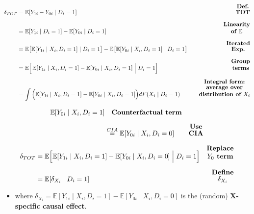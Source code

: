\documentclass[12pt]{article}
\begin{document}
\singlespacing
\begin{align}
\delta_{TOT} 
   &= \mathbb{E}[Y_{1i} - Y_{0i} \mid D_i = 1] 
   & \text{\textbf{\shortstack{Def. \\ TOT}}} \\[6pt]
&= \mathbb{E}[Y_{1i} \mid D_i=1] - \mathbb{E}[Y_{0i} \mid D_i=1] 
   & \text{\textbf{\shortstack{Linearity \\ of $\mathbb{E}$}}} \\[6pt]
&= \mathbb{E}\big[ \mathbb{E}[Y_{1i}\mid X_i, D_i=1] \mid D_i=1 \big] 
 - \mathbb{E}\big[ \mathbb{E}[Y_{0i}\mid X_i, D_i=1] \mid D_i=1 \big] 
   & \text{\textbf{\shortstack{Iterated \\ Exp.}}} \\[6pt]
&= \mathbb{E}\Big[ \, 
   \mathbb{E}[Y_{1i}\mid X_i, D_i=1] - \mathbb{E}[Y_{0i}\mid X_i, D_i=1] 
   \; \Big| \; D_i=1 \Big] 
   & \text{\textbf{\shortstack{Group \\ terms}}} \\[6pt]
&= \int \Big( \mathbb{E}[Y_{1i}\mid X_i, D_i=1] - \mathbb{E}[Y_{0i}\mid X_i, D_i=1] \Big) 
   dF(X_i \mid D_i=1) 
   & \quad \text{\textbf{\shortstack{Integral form: \\ average over \\ distribution of $X_i$}}}
\end{align}

\begin{align}
\mathbb{E}[Y_{0i}\mid X_i, D_i=1] 
   & \quad \text{\textbf{Counterfactual term}} \\[6pt]
&\overset{CIA}{=} \mathbb{E}[Y_{0i}\mid X_i, D_i=0] 
   & \text{\textbf{\shortstack{Use \\ CIA}}}
\end{align}

\begin{align}
\delta_{TOT} 
   &= \mathbb{E}\Big[ \mathbb{E}[Y_{1i}\mid X_i, D_i=1] - \mathbb{E}[Y_{0i}\mid X_i, D_i=0] 
      \;\Big|\; D_i=1 \Big] 
   & \text{\textbf{\shortstack{Replace \\ $Y_0$ term}}} \\[6pt]
&= \mathbb{E}[\delta_{X_i} \mid D_i=1] 
   & \text{\textbf{\shortstack{Define \\ $\delta_{X_i}$}}}
\end{align}


\begin{itemize}
    \item where \(\delta_{X_i} = \mathbb{E}[Y_{1i}\mid X_i, D_i=1] - \mathbb{E}[Y_{0i}\mid X_i, D_i=0]\)  
    is the (random) \textbf{X-specific causal effect}.
\end{itemize}
\end{document}
